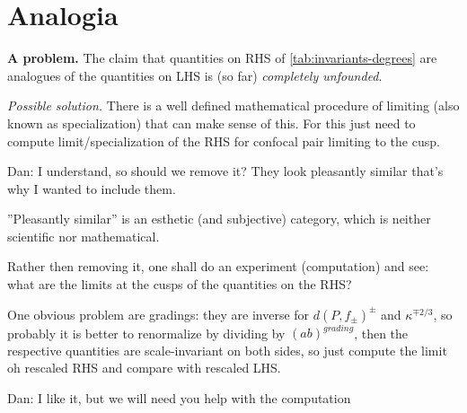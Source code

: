 \section{Analogia}

\textbf{A problem.} The claim that quantities on RHS of \ref{tab:invariants-degrees}
are analogues of the quantities on LHS
is (so far) \emph{completely unfounded}.

\emph{Possible solution.}
There is a well defined mathematical procedure
of limiting (also known as specialization) that can make sense of this.
For this just need to compute limit/specialization
of the RHS for confocal pair limiting to the cusp.


\textcolor{OliveGreen}{Dan: I understand, so should we remove it? They look pleasantly similar that's why I wanted to include them.}


''Pleasantly similar'' is an esthetic (and subjective) category, which is neither scientific nor mathematical.
                      
Rather then removing it,
one shall do an experiment (computation) and see:
what are the limits at the cusps of the quantities on the RHS?

One obvious problem are gradings: they are inverse for $d(P,f_\pm)^\pm$ and $κ^{\mp 2/3}$,
so probably it is better to renormalize by dividing by $(ab)^{grading}$,
then the respective quantities are scale-invariant on both sides,
so just compute the limit oh rescaled RHS and compare with rescaled LHS. 


\textcolor{OliveGreen}{Dan: I like it, but we will need you help with the computation}

